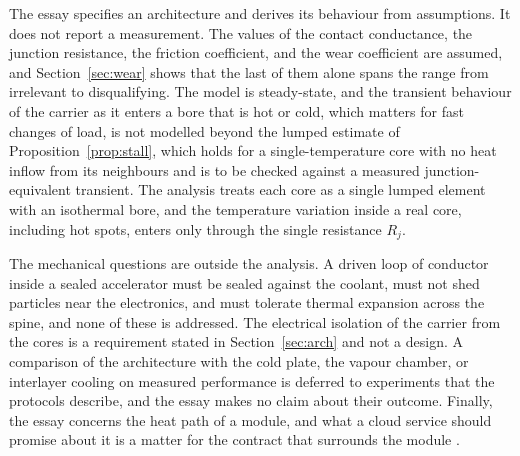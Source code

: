 \documentclass[11pt]{article}
\theoremstyle{definition}
\theoremstyle{plain}
\theoremstyle{remark}
\begin{document}
The essay specifies an architecture and derives its behaviour from assumptions. It does not report a measurement. The values of the contact conductance, the junction resistance, the friction coefficient, and the wear coefficient are assumed, and Section~\ref{sec:wear} shows that the last of them alone spans the range from irrelevant to disqualifying. The model is steady-state, and the transient behaviour of the carrier as it enters a bore that is hot or cold, which matters for fast changes of load, is not modelled beyond the lumped estimate of Proposition~\ref{prop:stall}, which holds for a single-temperature core with no heat inflow from its neighbours and is to be checked against a measured junction-equivalent transient. The analysis treats each core as a single lumped element with an isothermal bore, and the temperature variation inside a real core, including hot spots, enters only through the single resistance $R_j$.

The mechanical questions are outside the analysis. A driven loop of conductor inside a sealed accelerator must be sealed against the coolant, must not shed particles near the electronics, and must tolerate thermal expansion across the spine, and none of these is addressed. The electrical isolation of the carrier from the cores is a requirement stated in Section~\ref{sec:arch} and not a design. A comparison of the architecture with the cold plate, the vapour chamber, or interlayer cooling on measured performance is deferred to experiments that the protocols describe, and the essay makes no claim about their outcome. Finally, the essay concerns the heat path of a module, and what a cloud service should promise about it is a matter for the contract that surrounds the module \cite{flyxion-gpu}.
\end{document}
